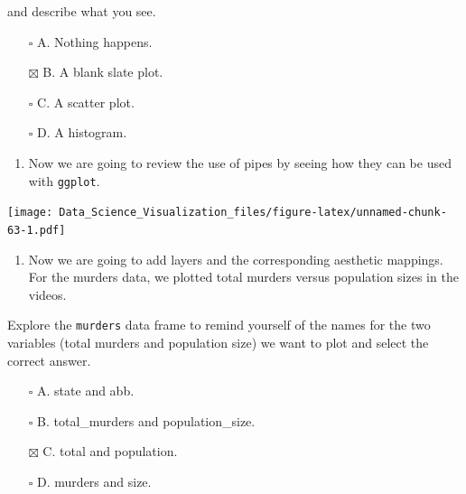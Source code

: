 \documentclass[
]{article}
\newenvironment{Shaded}{\begin{snugshade}}{\end{snugshade}}
\newcommand{\CommentTok}[1]{\textcolor[rgb]{0.56,0.35,0.01}{\textit{#1}}}
\newcommand{\KeywordTok}[1]{\textcolor[rgb]{0.13,0.29,0.53}{\textbf{#1}}}
\newcommand{\NormalTok}[1]{#1}
\newcommand{\OperatorTok}[1]{\textcolor[rgb]{0.81,0.36,0.00}{\textbf{#1}}}
\newcommand{\StringTok}[1]{\textcolor[rgb]{0.31,0.60,0.02}{#1}}
\providecommand{\tightlist}{%
  \setlength{\itemsep}{0pt}\setlength{\parskip}{0pt}}
\begin{document}
and describe what you see.

\begin{itemize}
\tightlist
\item[$\square$]
  A. Nothing happens.
\item[$\boxtimes$]
  B. A blank slate plot.
\item[$\square$]
  C. A scatter plot.
\item[$\square$]
  D. A histogram.
\end{itemize}

\begin{enumerate}
\def\labelenumi{\arabic{enumi}.}
\setcounter{enumi}{2}
\tightlist
\item
  Now we are going to review the use of pipes by seeing how they can be
  used with \texttt{ggplot}.
\end{enumerate}

\begin{Shaded}
\end{Shaded}

\texttt{[image: Data\_Science\_Visualization\_files/figure-latex/unnamed-chunk-63-1.pdf]}

\begin{enumerate}
\def\labelenumi{\arabic{enumi}.}
\setcounter{enumi}{3}
\tightlist
\item
  Now we are going to add layers and the corresponding aesthetic
  mappings. For the murders data, we plotted total murders versus
  population sizes in the videos.
\end{enumerate}

Explore the \texttt{murders} data frame to remind yourself of the names
for the two variables (total murders and population size) we want to
plot and select the correct answer.

\begin{itemize}
\tightlist
\item[$\square$]
  A. state and abb.
\item[$\square$]
  B. total\_murders and population\_size.
\item[$\boxtimes$]
  C. total and population.
\item[$\square$]
  D. murders and size.
\end{itemize}
\end{document}
